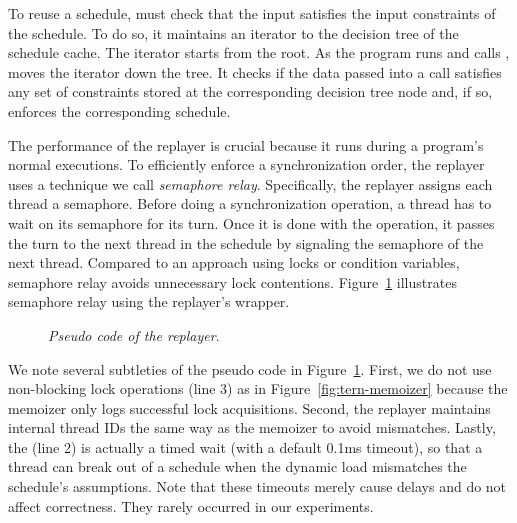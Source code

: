 To reuse a schedule, \tern must check that the input satisfies the input
constraints of the schedule.  To do so, it maintains an iterator to the
decision tree of the schedule cache.  The iterator starts from the root.
As the program runs and calls , \tern moves the iterator down
the tree.  It checks if the data passed into a  call
satisfies any set of constraints stored at the corresponding decision tree
node and, if so, enforces the corresponding schedule.
 
The performance of the replayer is crucial because it runs during a
program's normal executions.  To efficiently enforce a synchronization
order, the replayer uses a technique we call \emph{semaphore relay}.
Specifically, the replayer assigns each thread a semaphore.  Before doing
a synchronization operation, a thread has to wait on its semaphore for its
turn.  Once it is done with the operation, it passes the turn to the next
thread in the schedule by signaling the semaphore of the next thread.
Compared to an approach using locks or condition variables, semaphore
relay avoids unnecessary lock contentions.  Figure~\ref{fig:tern-replayer}
illustrates semaphore relay using the replayer's
 wrapper.

\begin{figure}[t]
\begin{minipage}[c]{.8\linewidth}
\tiny {}
\end{minipage}
\caption{\small \emph{Pseudo code of the replayer}.}
\label{fig:tern-replayer}
\vspace{-.2in}
\end{figure}

We note several subtleties of the pseudo code in
Figure~\ref{fig:tern-replayer}.  First, we do not use non-blocking lock
operations (line 3) as in Figure~\ref{fig:tern-memoizer} because the memoizer only logs successful lock
acquisitions.  Second, the replayer maintains internal thread IDs the same
way as the memoizer to avoid mismatches.  Lastly, the  (line 2)
is actually a timed wait (with a default 0.1ms timeout), so that a
thread can break out of a schedule when the dynamic load mismatches the
schedule's assumptions.  Note that these timeouts merely cause delays and
do not affect correctness.  They rarely occurred in our experiments.






